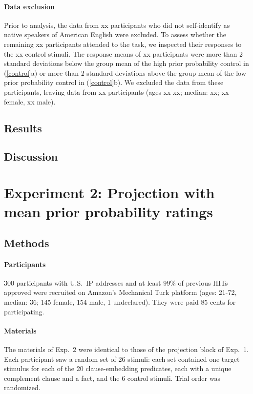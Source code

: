 \documentclass[11pt,fleqn]{article}
\newcommand{\6}{\mbox{$[\hspace*{-.6mm}[$}}
\newcommand{\9}{\mbox{$]\hspace*{-.6mm}]$}}
\begin{document}
\paragraph{Data exclusion} Prior to analysis, the data from xx participants who did not self-identify as native speakers of American English were excluded. To assess whether the remaining xx participants attended to the task, we inspected their responses to the xx control stimuli. The response means of xx participants were more than 2 standard deviations below the group mean of the high prior probability control in (\ref{control}a) or more than 2 standard deviations above the group mean of the low prior probability control in (\ref{control}b). We excluded the data from these participants, leaving data from xx participants (ages xx-xx; median: xx; xx female, xx male).

\subsection{Results}

\subsection{Discussion}

\section{Experiment 2: Projection with mean prior probability ratings}

\subsection{Methods}

\paragraph{Participants} 300 participants with U.S.\ IP addresses and at least 99\% of previous HITs approved were recruited on Amazon's Mechanical Turk platform (ages: 21-72, median: 36; 145 female, 154 male, 1 undeclared). They were paid 85 cents for participating.

\paragraph{Materials} The materials of Exp.~2 were identical to those of the projection block of Exp.~1. Each participant saw a random set of 26 stimuli: each set contained one target stimulus for each of the 20 clause-embedding predicates, each with a unique complement clause and a fact, and the 6 control stimuli. Trial order was randomized.
\end{document}
